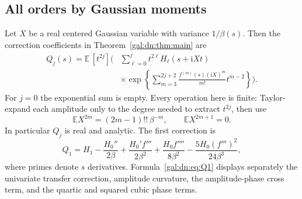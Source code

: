 \documentclass[11pt,letterpaper]{article}
\numberwithin{equation}{section}
\theoremstyle{definition}\newtheorem{definition}[theorem]{Definition}
\theoremstyle{remark}\newtheorem{remark}[theorem]{Remark}
\newcommand{\ii}{\mathrm i}
\newcommand{\E}{\mathbb E}
\begin{document}
\subsection{All orders by Gaussian moments}
Let $X$ be a real centered Gaussian variable with variance $1/\beta(s)$. Then the correction coefficients in Theorem~\ref{gal:dn:thm:main} are
\begin{equation}\label{gal:dn:eq:Qgen}
\begin{split}
Q_j(s)=\E\,[t^{2j}]\bigg(&\sum_{\ell=0}^j t^{2\ell}H_\ell(s+\ii Xt)\\[-2pt]
 &\times\exp\left\{\sum_{m=3}^{2j+2}
 \frac{f^{(m)}(s)(\ii X)^m}{m!}t^{m-2}\right\}\bigg).
\end{split}
\end{equation}
For $j=0$ the exponential sum is empty. Every operation here is finite: Taylor-expand each amplitude only to the degree needed to extract $t^{2j}$, then use
\[
 \E X^{2m}=(2m-1)!!\,\beta^{-m},\qquad \E X^{2m+1}=0.
\]
In particular $Q_j$ is real and analytic. The first correction is
\begin{equation}\label{gal:dn:eq:Q1}
 Q_1=H_1-\frac{H_0''}{2\beta}
 +\frac{H_0'f'''}{2\beta^2}
 +\frac{H_0 f''''}{8\beta^2}
 -\frac{5H_0(f''')^2}{24\beta^3},
\end{equation}
where primes denote $s$ derivatives. Formula~\eqref{gal:dn:eq:Q1} displays separately the univariate transfer correction, amplitude curvature, the amplitude-phase cross term, and the quartic and squared cubic phase terms.
\end{document}
